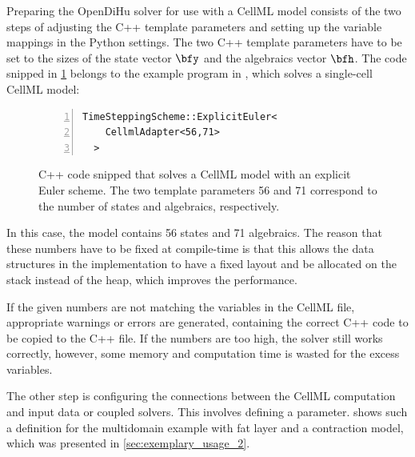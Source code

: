 Preparing the OpenDiHu solver for use with a CellML model consists of the two steps of adjusting the C++ template parameters and setting up the variable mappings in the Python settings. The two C++ template parameters have to be set to the sizes of the state vector $\bfy$ and the algebraics vector $\bfh$. The code snipped in \cref{fig:example_shorten_cellml} belongs to the example program in , which solves a single-cell CellML model:
\begin{figure}[H]
\centering
\begin{framed}
\begin{lstlisting}[basicstyle=\small\ttfamily,commentstyle=\color{gray},numbers=left]
  TimeSteppingScheme::ExplicitEuler<
    CellmlAdapter<56,71>
  >
\end{lstlisting}
\end{framed}
\caption{C++ code snipped that solves a CellML model with an explicit Euler scheme. The two template parameters 56 and 71 correspond to the number of states and algebraics, respectively.}%
\label{fig:example_shorten_cellml}%
\end{figure}
In this case, the model contains 56 states and 71 algebraics. The reason that these numbers have to be fixed at compile-time is that this allows the data structures in the implementation to have a fixed layout and be allocated on the stack instead of the heap, which improves the performance.

If the given numbers are not matching the variables in the CellML file, appropriate warnings or errors are generated, containing the correct C++ code to be copied to the C++ file. If the numbers are too high, the solver still works correctly, however, some memory and computation time is wasted for the excess variables.

The other step is configuring the connections between the CellML computation and input data or coupled solvers. This involves defining a  parameter.  shows such a definition for the multidomain example with fat layer and a contraction model, which was presented in \cref{sec:exemplary_usage_2}.


